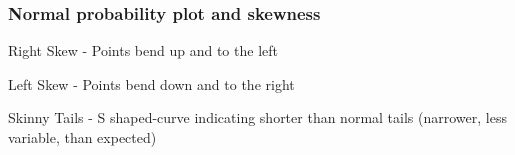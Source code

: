 \documentclass[11pt,containsverbatim,handout,xcolor=xelatex,dvipsnames,table]{beamer}
\begin{document}
\begin{frame}
\frametitle{Normal probability plot and skewness}

{
Right Skew - Points bend up and to the left
}

\pause
{}
{
Left Skew - Points bend down and to the right 
}

\pause
{}
{
Skinny Tails - S shaped-curve indicating shorter than normal tails (narrower, less variable, than expected)
}


\end{frame}
\end{document}
